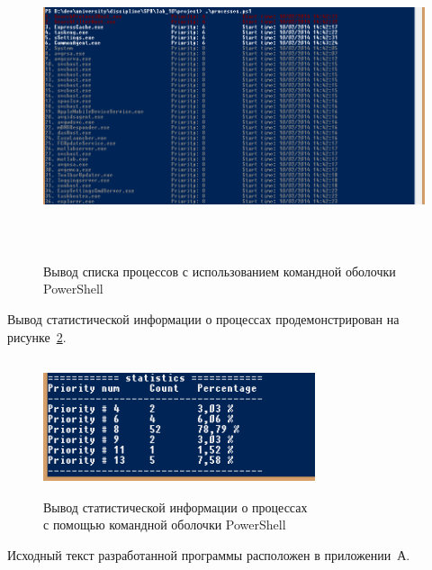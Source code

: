 \begin{figure}[htbp]
  \centering
  \includegraphics[width=150mm,height=90mm]{img/process}
  \caption{Вывод списка процессов с использованием командной оболочки PowerShell}\label{fig:process}
\end{figure}

Вывод статистической информации о процессах продемонстрирован на рисунке~\ref{fig:statistics}.

\begin{figure}[htbp]
  \centering
  \includegraphics[width=80mm,height=40mm]{img/statistics}
  \caption{Вывод статистической информации о процессах \\ с помощью командной оболочки PowerShell}\label{fig:statistics}
\end{figure}

Исходный текст разработанной программы расположен в приложении~А.

\newpage
